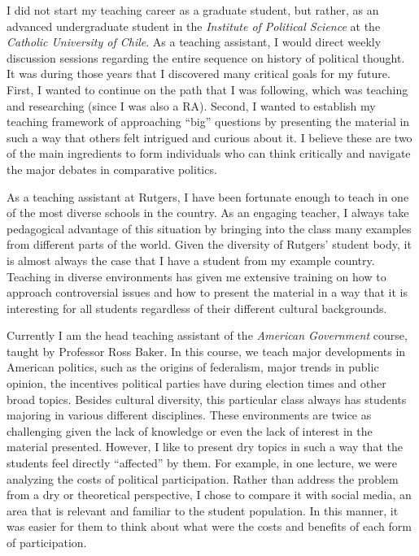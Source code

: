 \documentclass[11pt]{letter} %
\begin{document}
\begin{letter}{}
I did not start my teaching career as a graduate student, but rather, as an advanced undergraduate student in the \emph{Institute of Political Science} at the \emph{Catholic University of Chile}. As a teaching assistant, I would direct weekly discussion sessions regarding the entire sequence on history of political thought. It was during those years that I discovered many critical goals for my future. First, I wanted to continue on the path that I was following, which was teaching and researching (since I was also a RA). Second, I wanted to establish my teaching framework of approaching ``big'' questions by presenting the material in such a way that others felt intrigued and curious about it. I believe these are two of the main ingredients to form individuals who can think critically and navigate the major debates in comparative politics. 

As a teaching assistant at Rutgers, I have been fortunate enough to teach in one of the most diverse schools in the country. As an engaging teacher, I always take pedagogical advantage of this situation by bringing into the class many examples from different parts of the world. Given the diversity of Rutgers' student body, it is almost always the case that I have a student from my example country. Teaching in diverse environments has given me extensive training on how to approach controversial issues and how to present the material in a way that it is interesting for all students regardless of their different cultural backgrounds. 

Currently I am the head teaching assistant of the \emph{American Government} course, taught by Professor Ross Baker. In this course, we teach major developments in American politics, such as the origins of federalism, major trends in public opinion, the incentives political parties have during election times and other broad topics. Besides cultural diversity, this particular class always has students majoring in various different disciplines. These environments are twice as challenging given the lack of knowledge or even the lack of interest in the material presented. However, I like to present dry topics in such a way that the students feel directly ``affected'' by them. For example, in one lecture, we were analyzing the costs of political participation. Rather than address the problem from a dry or theoretical perspective, I chose to compare it with social media, an area that is relevant and familiar to the student population. In this manner, it was easier for them to think about what were the costs and benefits of each form of participation. 


\end{letter}
\end{document}
